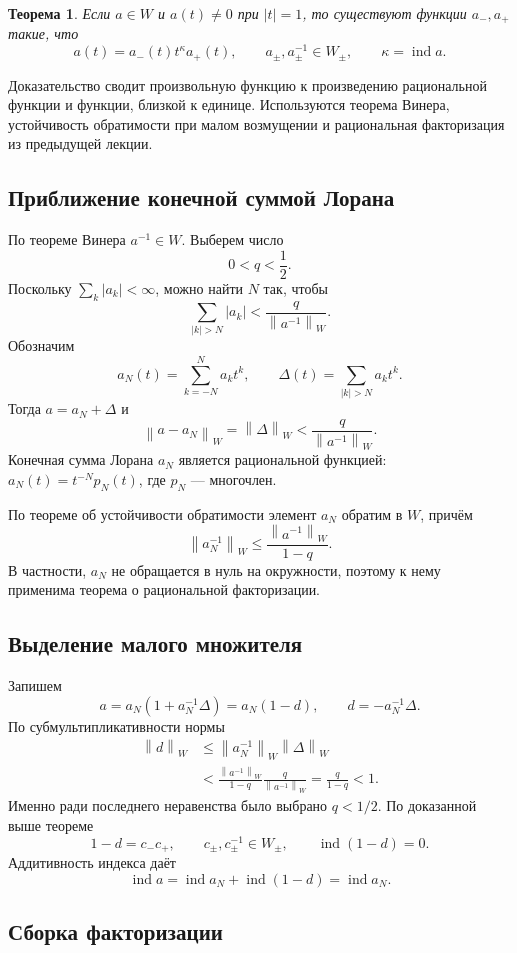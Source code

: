 \documentclass[12pt,a4paper]{article}
\newtheorem{theorem}{Теорема}
\theoremstyle{definition}
\theoremstyle{remark}
\newcommand{\norm}[1]{\left\lVert #1\right\rVert}
\DeclareMathOperator{\ind}{ind}
\begin{document}
\begin{theorem}
Если $a\in W$ и $a(t)\ne0$ при $|t|=1$, то существуют функции
$a_-,a_+$ такие, что
\[
  \boxed{a(t)=a_-(t)t^{\kappa}a_+(t)},\qquad
  a_\pm,a_\pm^{-1}\in W_\pm,\qquad \kappa=\ind a.
\]
\end{theorem}

Доказательство сводит произвольную функцию к произведению
рациональной функции и функции, близкой к единице. Используются
теорема Винера, устойчивость обратимости при малом возмущении
и рациональная факторизация из предыдущей лекции.

\subsection{Приближение конечной суммой Лорана}

По теореме Винера $a^{-1}\in W$. Выберем число
\[
  0<q<\frac12.
\]
Поскольку $\sum_k|a_k|<\infty$, можно найти $N$ так, чтобы
\[
  \sum_{|k|>N}|a_k|<\frac{q}{\norm{a^{-1}}_W}.
\]
Обозначим
\[
  a_N(t)=\sum_{k=-N}^{N}a_kt^k,\qquad
  \Delta(t)=\sum_{|k|>N}a_kt^k.
\]
Тогда $a=a_N+\Delta$ и
\[
  \norm{a-a_N}_W=\norm{\Delta}_W
  <\frac{q}{\norm{a^{-1}}_W}.
\]
Конечная сумма Лорана $a_N$ является рациональной функцией:
$a_N(t)=t^{-N}p_N(t)$, где $p_N$ --- многочлен.

По теореме об устойчивости обратимости элемент $a_N$ обратим в $W$,
причём
\[
  \norm{a_N^{-1}}_W\leqslant\frac{\norm{a^{-1}}_W}{1-q}.
\]
В частности, $a_N$ не обращается в нуль на окружности, поэтому к нему
применима теорема о рациональной факторизации.

\subsection{Выделение малого множителя}

Запишем
\[
  a=a_N(1+a_N^{-1}\Delta)=a_N(1-d),\qquad
  d=-a_N^{-1}\Delta.
\]
По субмультипликативности нормы
\begin{align*}
  \norm{d}_W
  &\leqslant\norm{a_N^{-1}}_W\norm{\Delta}_W\\
  &<\frac{\norm{a^{-1}}_W}{1-q}
       \frac{q}{\norm{a^{-1}}_W}
   =\frac{q}{1-q}<1.
\end{align*}
Именно ради последнего неравенства было выбрано $q<1/2$.
По доказанной выше теореме
\[
  1-d=c_-c_+,\qquad c_\pm,c_\pm^{-1}\in W_\pm,
  \qquad \ind(1-d)=0.
\]
Аддитивность индекса даёт
\[
  \ind a=\ind a_N+\ind(1-d)=\ind a_N.
\]

\subsection{Сборка факторизации}
\end{document}
